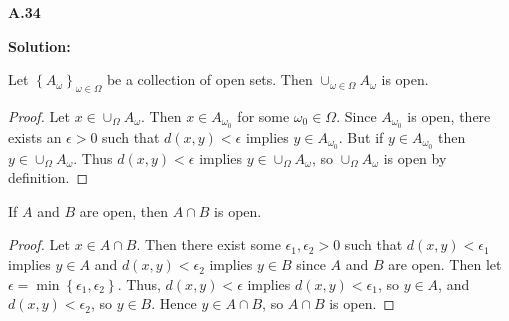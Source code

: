 \documentclass[12pt]{article}
\begin{document}
% 


{\bf A.34}

{\bf Solution:}

\begin{Proposition}
Let $\left\{ A_{\omega} \right\}_{\omega \in \Omega}$ be a collection of open sets. Then $\cup_{\omega\in\Omega}A_{\omega}$ is open.
\end{Proposition}
\begin{proof}
Let $x \in \cup_{\Omega}A_{\omega}$. Then $x \in A_{\omega_{0}}$ for some $\omega_{0} \in \Omega$. Since $A_{\omega_{0}}$ is open, there exists an
$\epsilon > 0$ such that $d(x,y) < \epsilon$ implies $y \in A_{\omega_{0}}$. But if $y \in A_{\omega_{0}}$ then $y \in \cup_{\Omega}A_{\omega}$. Thus
$d(x,y) < \epsilon$ implies $y \in \cup_{\Omega}A_{\omega}$, so $\cup_{\Omega}A_{\omega}$ is open by definition.
\end{proof}

\begin{Proposition}
If $A$ and $B$ are open, then $A\cap B$ is open.
\end{Proposition}
\begin{proof}
Let $x \in A\cap B$. Then there exist some $\epsilon_{1}, \epsilon_{2} > 0$ such that $d(x,y) < \epsilon_{1}$ implies $y \in A$ and $d(x,y) <
\epsilon_{2}$ implies $y \in B$ since $A$ and $B$ are open. Then let $\epsilon = \min\left\{ \epsilon_{1}, \epsilon_{2} \right\}$. Thus, $d(x,y) <
\epsilon$ implies $d(x,y) < \epsilon_{1}$, so $y \in A$, and $d(x,y) < \epsilon_{2}$, so $y \in B$. Hence $y \in A\cap B$, so $A \cap B$ is open.
\end{proof}
\end{document}
